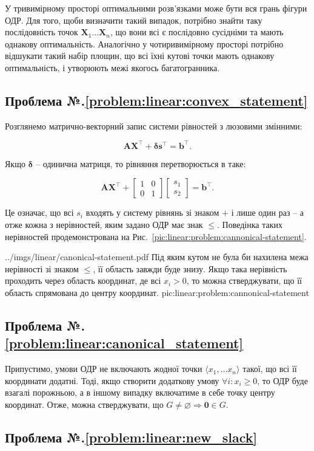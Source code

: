 \documentclass[\main/book.tex]{subfiles}
\begin{document}
У тривимірному просторі оптимальними розв'язками може бути вся грань фігури ОДР. Для того, щоби визначити такий випадок, потрібно знайти таку послідовність точок $\mathbf{X}_1 \ldots \mathbf{X}_n$, що вони всі є послідовно сусідніми та мають однакову оптимальність. Аналогічно у чотиривимірному просторі потрібно відшукати такий набір площин, що всі їхні кутові точки мають однакову оптимальність, і утворюють межі якогось багатогранника.

\subsection*{Проблема №.\ref{problem:linear:convex_statement}}

Розглянемо матрично-векторний запис системи рівностей з люзовими змінними:

\[
 \mathbf{A} \mathbf{X}^\top + \mathbf{\delta} \mathbf{s}^\top = \mathbf{b}^\top\text{.}
\]

Якщо $\mathbf{\delta}$ -- одинична матриця, то рівняння перетворюється в таке:


\[
 \mathbf{A} \mathbf{X}^\top +
 \left[
  \begin{array}{cc}
   1 & 0 \\
   0 & 1
  \end{array}
 \right]
 \left[
  \begin{array}{c}
   s_1 \\
   s_2
  \end{array}
 \right] = \mathbf{b}^\top\text{.}
\]

Це означає, що всі $s_i$ входять у систему рівнянь зі знаком \flqq{}$+$\frqq{} і лише один раз -- а отже кожна з нерівностей, яким задано ОДР має знак \flqq{}$\leq$\frqq{}. Поведінка таких нерівностей продемонстрована на Рис.~\ref{pic:linear:problem:cannonical-statement}.

\illustration
 {../imgs/linear/canonical-statement.pdf}
 {Під яким кутом не була би нахилена межа нерівності зі знаком \flqq{}$\leq$\frqq{}, її область завжди буде знизу. Якщо така нерівність проходить через область координат, де всі $x_i > 0$, то можна стверджувати, що її область спрямована до центру координат.}
 {pic:linear:problem:cannonical-statement}

\subsection*{Проблема №.\ref{problem:linear:canonical_statement}}

Припустимо, умови ОДР не включають жодної точки $\langle x_1, \ldots x_n \rangle$ такої, що всі її координати додатні. Тоді, якщо створити додаткову умову $\forall i: x_i \geq 0$, то ОДР буде взагалі порожньою, а в іншому випадку включатиме в себе точку центру координат. Отже, можна стверджувати, що $G \neq \varnothing \Rightarrow \mathbf{0} \in G$.

\subsection*{Проблема №.\ref{problem:linear:new_slack}}
\end{document}
